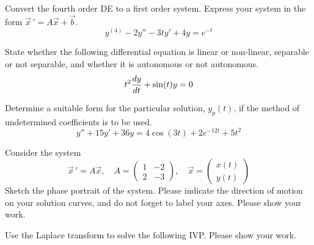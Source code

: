 \documentclass[12pt]{exam}
\begin{document}
    


\newpage


\InitialsRight

\begin{questions}

    \question[2] Convert the fourth order DE to a first order system. Express your system in the form $\vec x \, ' = A\vec x +\vec b$. 
    $$y^{(4)}- 2 y'' -3ty'+4y = e^{-t}$$
    \vspace{6cm}
    
    \question[1] State whether the following differential equation is linear or non-linear, separable or not separable, and whether it is autonomous or not autonomous. 
    $$t^2{\frac{dy}{dt}} + \sin(t) y = 0$$
    \vspace{2cm}

    \question[4] Determine a suitable form for the particular solution, \(y_p(t)\), if the method of undetermined coefficients is to be used. 
    $$y''+ 15y'+36y = 4\cos(3t)+2e^{-12t}+5t^2$$  
    
    
    \newpage 
    \question[3]  Consider the system $$\vec x \, ' = A\vec x, \quad A = \begin{pmatrix} 1&-2\\2&-3 \end{pmatrix}, \quad \vec x = \begin{pmatrix} x(t)\\y(t)\end{pmatrix} $$ Sketch the phase portrait of the system. Please indicate the direction of motion on your solution curves, and do not forget to label your axes. Please show your work.
    \vspace{5cm}
    
    
    
    
    

    
    
    \newpage 
    \question[10] Use the Laplace transform to solve the following IVP. Please show your work. 


\end{questions}
\end{document}
